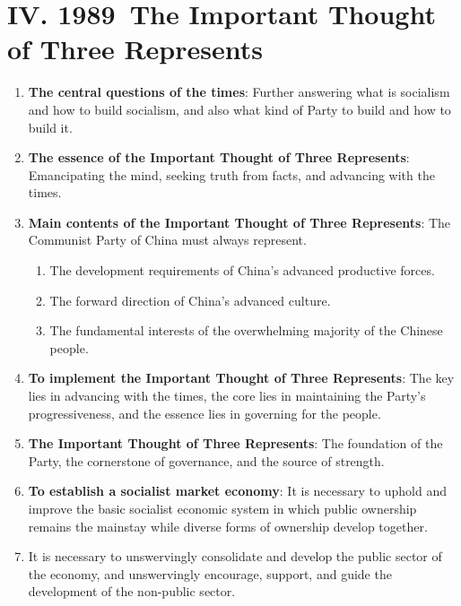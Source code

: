 \documentclass[11pt,a4paper]{ctexart}
\begin{document}
\section{IV. 1989~The Important Thought of Three Represents}

\begin{enumerate}[leftmargin=2em]
    \item \textbf{The central questions of the times}: Further answering what is socialism and how to build socialism, and also what kind of Party to build and how to build it.
    
    \item \textbf{The essence of the Important Thought of Three Represents}: Emancipating the mind, seeking truth from facts, and advancing with the times.
    
    \item \textbf{Main contents of the Important Thought of Three Represents}: The Communist Party of China must always represent.
    \begin{enumerate}[label=(\arabic*),leftmargin=2em]
        \item The development requirements of China's advanced productive forces.
        \item The forward direction of China's advanced culture.
        \item The fundamental interests of the overwhelming majority of the Chinese people.
    \end{enumerate}
    
    \item \textbf{To implement the Important Thought of Three Represents}: The key lies in advancing with the times, the core lies in maintaining the Party's progressiveness, and the essence lies in governing for the people.
    
    \item \textbf{The Important Thought of Three Represents}: The foundation of the Party, the cornerstone of governance, and the source of strength.
    
    \item \textbf{To establish a socialist market economy}: It is necessary to uphold and improve the basic socialist economic system in which public ownership remains the mainstay while diverse forms of ownership develop together.
    
    \item It is necessary to unswervingly consolidate and develop the public sector of the economy, and unswervingly encourage, support, and guide the development of the non-public sector.
\end{enumerate}
\end{document}

